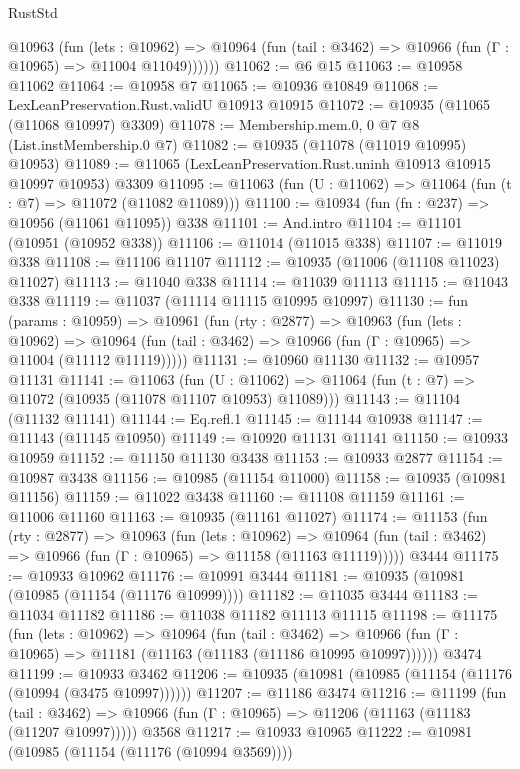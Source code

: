 \begin{lexlean}{RustStd}
\begin{coremodule}
{\begin{coremodule}
{{{{{{{{{{{{{{{{{{{{{{{{{{{{{{{{{{{{{{{{{{{{{{{{{{{{{{{{{{{{{{{{{{{{{{{{{{{{{{{{{{{{{        @10963
          (fun (lets : @10962) =>
          @10964 (fun (tail : @3462) => @10966 (fun (Γ : @10965) => @11004 @11049))))))
@11062 := @6 @15
@11063 := @10958 @11062
@11064 := @10958 @7
@11065 := @10936 @10849
@11068 := LexLeanPreservation.Rust.validU @10913 @10915
@11072 := @10935 (@11065 (@11068 @10997) @3309)
@11078 := Membership.mem.{0, 0} @7 @8 (List.instMembership.{0} @7)
@11082 := @10935 (@11078 (@11019 @10995) @10953)
@11089 := @11065 (LexLeanPreservation.Rust.uninh @10913 @10915 @10997 @10953) @3309
@11095 := @11063 (fun (U : @11062) => @11064 (fun (t : @7) => @11072 (@11082 @11089)))
@11100 := @10934 (fun (fn : @237) => @10956 (@11061 @11095)) @338
@11101 := And.intro
@11104 := @11101 (@10951 (@10952 @338))
@11106 := @11014 (@11015 @338)
@11107 := @11019 @338
@11108 := @11106 @11107
@11112 := @10935 (@11006 (@11108 @11023) @11027)
@11113 := @11040 @338
@11114 := @11039 @11113
@11115 := @11043 @338
@11119 := @11037 (@11114 @11115 @10995 @10997)
@11130 := fun (params : @10959) =>
  @10961
    (fun (rty : @2877) =>
    @10963
      (fun (lets : @10962) =>
      @10964 (fun (tail : @3462) => @10966 (fun (Γ : @10965) => @11004 (@11112 @11119)))))
@11131 := @10960 @11130
@11132 := @10957 @11131
@11141 := @11063
    (fun (U : @11062) => @11064 (fun (t : @7) => @11072 (@10935 (@11078 @11107 @10953) @11089)))
@11143 := @11104 (@11132 @11141)
@11144 := Eq.refl.{1}
@11145 := @11144 @10938
@11147 := @11143 (@11145 @10950)
@11149 := @10920 @11131 @11141
@11150 := @10933 @10959
@11152 := @11150 @11130 @3438
@11153 := @10933 @2877
@11154 := @10987 @3438
@11156 := @10985 (@11154 @11000)
@11158 := @10935 (@10981 @11156)
@11159 := @11022 @3438
@11160 := @11108 @11159
@11161 := @11006 @11160
@11163 := @10935 (@11161 @11027)
@11174 := @11153
    (fun (rty : @2877) =>
    @10963
      (fun (lets : @10962) =>
      @10964 (fun (tail : @3462) => @10966 (fun (Γ : @10965) => @11158 (@11163 @11119)))))
    @3444
@11175 := @10933 @10962
@11176 := @10991 @3444
@11181 := @10935 (@10981 (@10985 (@11154 (@11176 @10999))))
@11182 := @11035 @3444
@11183 := @11034 @11182
@11186 := @11038 @11182 @11113 @11115
@11198 := @11175
    (fun (lets : @10962) =>
    @10964
      (fun (tail : @3462) =>
      @10966 (fun (Γ : @10965) => @11181 (@11163 (@11183 (@11186 @10995 @10997))))))
    @3474
@11199 := @10933 @3462
@11206 := @10935 (@10981 (@10985 (@11154 (@11176 (@10994 (@3475 @10997))))))
@11207 := @11186 @3474
@11216 := @11199
    (fun (tail : @3462) => @10966 (fun (Γ : @10965) => @11206 (@11163 (@11183 (@11207 @10997)))))
    @3568
@11217 := @10933 @10965
@11222 := @10981 (@10985 (@11154 (@11176 (@10994 @3569))))
}}}}}}}}}}}}}}}}}}}}}}}}}}}}}}}}}}}}}}}}}}}}}}}}}}}}}}}}}}}}}}}}}}}}}}}}}}}}}}}}}}}}}
\end{coremodule}}
\end{coremodule}
\end{lexlean}
